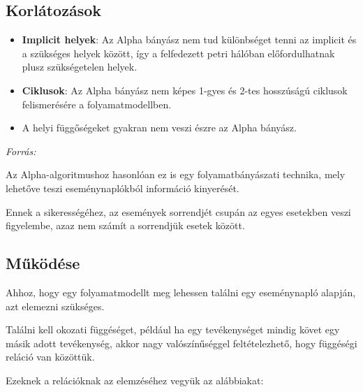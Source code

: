 \newpage

\subsection{Korlátozások}
\begin{itemize}
\item \textbf{Implicit helyek}: Az Alpha bányász nem tud különbséget tenni az implicit és a szükséges helyek között, így a felfedezett petri hálóban előfordulhatnak plusz szükségetelen helyek.
\item \textbf{Ciklusok}: Az Alpha bányász nem képes 1-gyes és 2-tes hosszúságú ciklusok felismerésére a folyamatmodellben.
\item A helyi függőségeket gyakran nem veszi észre az Alpha bányász.
\end{itemize}

\textit{Forrás: \cite{wiki:001}}


Az Alpha-algoritmushoz hasonlóan ez is egy folyamatbányászati technika, mely lehetőve teszi eseménynaplókból információ kinyerését.

Ennek a sikerességéhez, az események sorrendjét csupán az egyes esetekben veszi figyelembe, azaz nem számít a sorrendjük esetek között.

\subsection{Működése}

Ahhoz, hogy egy folyamatmodellt meg lehessen találni egy eseménynapló alapján, azt elemezni szükséges.

Találni kell okozati függéséget, például ha egy tevékenységet mindig követ egy másik adott tevékenység, akkor nagy valószínűséggel feltételezhető, hogy függéségi reláció van közöttük. 

Ezeknek a relációknak az elemzéséhez vegyük az alábbiakat:

